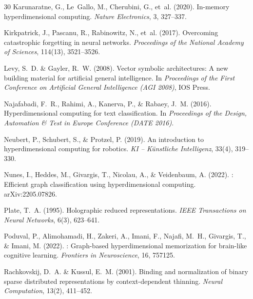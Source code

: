 \documentclass[11pt]{article}
\begin{document}
\begin{thebibliography}{30}
Karunaratne, G., Le~Gallo, M., Cherubini, G., et~al. (2020).
\newblock In-memory hyperdimensional computing.
\newblock \textit{Nature Electronics}, 3, 327--337.

Kirkpatrick, J., Pascanu, R., Rabinowitz, N., et~al. (2017).
\newblock Overcoming catastrophic forgetting in neural networks.
\newblock \textit{Proceedings of the National Academy of Sciences}, 114(13), 3521--3526.

Levy, S.~D. \& Gayler, R.~W. (2008).
\newblock Vector symbolic architectures: A new building material for artificial general intelligence.
\newblock In \textit{Proceedings of the First Conference on Artificial General Intelligence (AGI 2008)}, IOS Press.

Najafabadi, F.~R., Rahimi, A., Kanerva, P., \& Rabaey, J.~M. (2016).
\newblock Hyperdimensional computing for text classification.
\newblock In \textit{Proceedings of the Design, Automation \& Test in Europe Conference (DATE 2016)}.

Neubert, P., Schubert, S., \& Protzel, P. (2019).
\newblock An introduction to hyperdimensional computing for robotics.
\newblock \textit{KI -- K{\"u}nstliche Intelligenz}, 33(4), 319--330.

Nunes, I., Heddes, M., Givargis, T., Nicolau, A., \& Veidenbaum, A. (2022).
: Efficient graph classification using hyperdimensional computing.
\newblock arXiv:2205.07826.

Plate, T.~A. (1995).
\newblock Holographic reduced representations.
\newblock \textit{IEEE Transactions on Neural Networks}, 6(3), 623--641.

Poduval, P., Alimohamadi, H., Zakeri, A., Imani, F., Najafi, M.~H., Givargis, T., \& Imani, M. (2022).
: Graph-based hyperdimensional memorization for brain-like cognitive learning.
\newblock \textit{Frontiers in Neuroscience}, 16, 757125.

Rachkovskij, D.~A. \& Kussul, E.~M. (2001).
\newblock Binding and normalization of binary sparse distributed representations by context-dependent thinning.
\newblock \textit{Neural Computation}, 13(2), 411--452.


\end{thebibliography}
\end{document}
